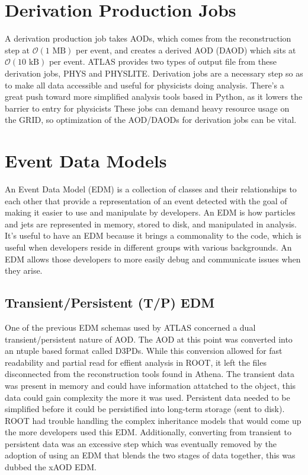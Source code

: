 \section{Derivation Production Jobs}
A derivation production job takes AODs, which comes from the reconstruction step at $\mathcal{O}(1 \text{ MB})$ per event, and creates a derived AOD (DAOD) which sits at $\mathcal{O}(10 \text{ kB})$ per event.
ATLAS provides two types of output file from these derivation jobs, PHYS and PHYSLITE. 
Derivation jobs are a necessary step so as to make all data accessible and useful for physicists doing analysis.
There's a great push toward more simplified analysis tools based in Python, as it lowers the barrier to entry for physicists  
These jobs can demand heavy resource usage on the GRID, so optimization of the AOD/DAODs for derivation jobs can be vital. 


\section{Event Data Models}
An Event Data Model (EDM) is a collection of classes and their relationships to each other that provide a representation of an event detected with the goal of making it easier to use and manipulate by developers.
An EDM is how particles and jets are represented in memory, stored to disk, and manipulated in analysis.
It's useful to have an EDM because it brings a commonality to the code, which is useful when developers reside in different groups with various backgrounds.
An EDM allows those developers to more easily debug and communicate issues when they arise.  

\subsection{Transient/Persistent (T/P) EDM}
One of the previous EDM schemas used by ATLAS concerned a dual transient/persistent nature of AOD.
The AOD at this point was converted into an ntuple based format called D3PDs. 
While this conversion allowed for fast readability and partial read for effient analysis in ROOT, it left the files disconnected from the reconstruction tools found in Athena.\cite{Athena_xAOD_design}
The transient data was present in memory and could have information attatched to the object, this data could gain complexity the more it was used.
Persistent data needed to be simplified before it could be persistified into long-term storage (sent to disk). 
ROOT had trouble handling the complex inheritance models that would come up the more developers used this EDM. 
Additionally, converting from transient to persistent data was an excessive step which was eventually removed by the adoption of using an EDM that blends the two stages of data together, this was dubbed the xAOD EDM.


